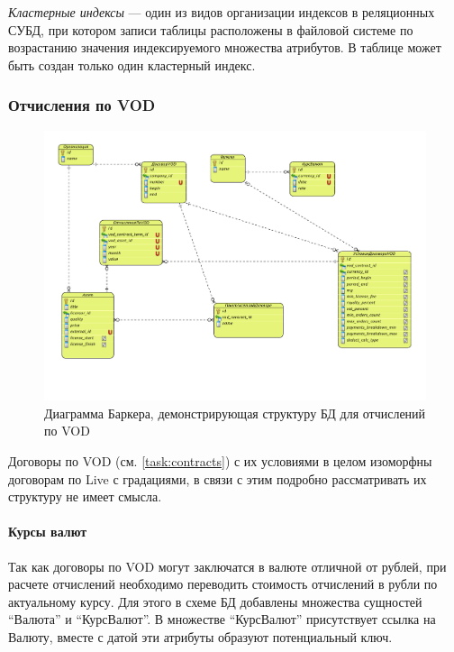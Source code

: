 \textit{Кластерные индексы} --- один из видов организации индексов в реляционных СУБД, при котором
записи таблицы расположены в файловой системе по возрастанию значения индексируемого множества атрибутов.
В таблице может быть создан только один кластерный индекс. 

\subsubsection{Отчисления по VOD}
\begin{figure}[!ht]

\begin{center}
\vspace{-0.5cm}
\includegraphics[scale=0.65, trim=10mm 28mm 0mm 10mm, clip]{../resources/uml/VOD_DEDUCT.pdf}
\caption{Диаграмма Баркера, демонстрирующая структуру БД для отчислений по VOD}
\label{gr:vod_deduct}
\end{center} 
\end{figure}

Договоры по VOD (см. \ref{task:contracts}) с их условиями в целом изоморфны договорам по Live с градациями, в связи с этим
подробно рассматривать их структуру не имеет смысла. 

\paragraph{Курсы валют} Так как договоры по VOD могут заключатся в валюте отличной от рублей,
при расчете отчислений необходимо переводить стоимость отчислений в рубли по актуальному курсу.
Для этого в схеме БД добавлены множества сущностей ``Валюта'' и ``КурсВалют''. В множестве
``КурсВалют'' присутствует ссылка на Валюту, вместе с датой эти атрибуты образуют потенциальный ключ.

